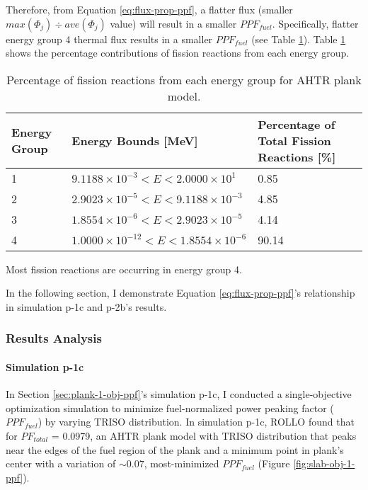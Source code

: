 Therefore, from Equation \ref{eq:flux-prop-ppf}, a flatter flux (smaller 
$max(\Phi_j) \div ave(\Phi_j)$ value) will result in a smaller $PPF_{fuel}$. 
Specifically, flatter energy group 4 thermal flux results in a smaller $PPF_{fuel}$
(see Table \ref{tab:fission-flux}). 
Table \ref{tab:fission-flux} shows the percentage contributions of fission reactions from 
each energy group. 
\begin{table}[htbp!]
    \centering
    \onehalfspacing
    \caption{Percentage of fission reactions from each energy group for \gls{AHTR} plank model.}
	\label{tab:fission-flux}
    \footnotesize
    \begin{tabular}{llp{4cm}}
    \hline 
    \textbf{Energy Group} & \textbf{Energy Bounds [MeV]} & \textbf{Percentage of Total Fission Reactions [\%]} \\
    \hline
    1 & $9.1188\times 10^{-3} < E < 2.0000\times 10^1$ & 0.85 \\ 
    2 & $2.9023\times 10^{-5} < E < 9.1188\times 10^{-3}$ & 4.85 \\
    3 & $1.8554\times 10^{-6} < E < 2.9023\times 10^{-5}$ & 4.14 \\
    4 & $1.0000\times 10^{-12} < E < 1.8554\times 10^{-6}$ & 90.14 \\
    \hline
    \end{tabular}
\end{table}
Most fission reactions are occurring in energy group 4. 

In the following section, I demonstrate Equation \ref{eq:flux-prop-ppf}'s relationship 
in simulation p-1c and p-2b's results. 

\subsubsection{Results Analysis}
\label{sec:plank-discussion-ppf-results}

\paragraph{Simulation p-1c}
In Section \ref{sec:plank-1-obj-ppf}'s simulation p-1c, I conducted a single-objective 
optimization simulation to minimize fuel-normalized power peaking factor ($PPF_{fuel}$) 
by varying TRISO distribution. 
In simulation p-1c, \gls{ROLLO} found that for $PF_{total}$ = 0.0979, an \gls{AHTR} 
plank model with TRISO distribution that peaks near the edges of the fuel region of 
the plank and a minimum point in plank's center with a variation of $\sim0.07$, 
most-minimized $PPF_{fuel}$ (Figure \ref{fig:slab-obj-1-ppf}). 

